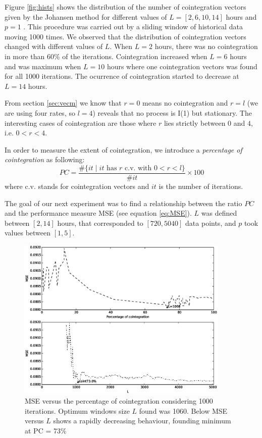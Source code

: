 Figure \ref{fig:hists} shows the distribution of the number of cointegration
vectors given by the Johansen method for different values of $L=[2,6,10,14]$
hours and $p=1$ . This procedure was carried out by a sliding window of
historical data moving 1000 times. We observed that the distribution of
cointegration vectors changed with different values of $L$. When
$L=2$ hours, there was no cointegration in more than 60\% of the iterations.
Cointegration increased when $L=6$ hours and was maximum when $L=10$ hours where
one cointegration vectors was found for all 1000 iterations. The ocurrence of
cointegration started to decrease at $L=14$ hours.

From section \ref{sec:vecm} we know that $r=0$ means no cointegration and
$r=l$ (we are using four rates, so $l=4$) reveals that no process is I(1) but
stationary.  The interesting cases of cointegration are those where $r$ lies
strictly between $0$ and $4$, i.e. $0<r<4$.

In order to measure the extent of cointegration, we introduce a
{\em percentage of cointegration\/} as following:
\begin{equation} \label{eq:pcoint}
PC = 
\frac{\#\{ it \mid \text{$it$ has $r$ c.v. with $0<r<l$}\}}
     {\#it}\times 100
\end{equation}
where c.v. stands for cointegration vectors and $it$ is the number of iterations.

The goal of our next experiment was to find a relationship between the ratio $PC$
and the performance measure MSE (see equation \ref{eq:MSE}). $L$ was defined
between $[2,14]$ hours, that corresponded to $[720, 5040]$ data points, and $p$
took values between $[1,5]$.  

\begin{figure}[ht!]
  \centering
   \includegraphics[width=0.9\textwidth]{img/51_Fig2}
  \caption{MSE versus the percentage of cointegration considering 1000
  iterations. Optimum windows size $L$ found was 1060. Below MSE versus $L$ shows a
  rapidly decreasing behaviour, founding minimum at PC = 73\% }
  \label{fig:cointvsmse}
\end{figure}

